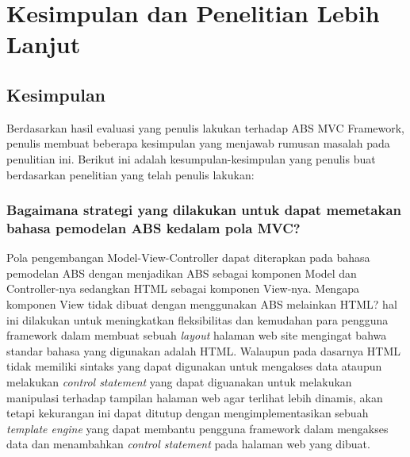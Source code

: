 \chapter{Kesimpulan dan Penelitian Lebih Lanjut}

\section{Kesimpulan}
Berdasarkan hasil evaluasi yang penulis lakukan terhadap ABS MVC Framework, penulis membuat beberapa kesimpulan yang menjawab rumusan masalah pada penulitian ini. Berikut ini adalah kesumpulan-kesimpulan yang penulis buat berdasarkan penelitian yang telah penulis lakukan:

\subsection{Bagaimana strategi yang dilakukan untuk dapat memetakan bahasa pemodelan ABS kedalam pola MVC?}

Pola pengembangan Model-View-Controller dapat diterapkan pada bahasa pemodelan ABS dengan menjadikan ABS sebagai komponen Model dan Controller-nya sedangkan HTML sebagai komponen View-nya. Mengapa komponen View tidak dibuat dengan menggunakan ABS melainkan HTML? hal ini dilakukan untuk meningkatkan fleksibilitas dan kemudahan para pengguna framework dalam membuat sebuah \textit{layout} halaman web site mengingat bahwa standar bahasa yang digunakan adalah HTML. Walaupun pada dasarnya HTML tidak memiliki sintaks yang dapat digunakan untuk mengakses data ataupun melakukan \textit{control statement} yang dapat diguanakan untuk melakukan manipulasi terhadap tampilan halaman web agar terlihat lebih dinamis, akan tetapi kekurangan ini dapat ditutup dengan mengimplementasikan sebuah \textit{template engine} yang dapat membantu pengguna framework dalam mengakses data dan menambahkan \textit{control statement} pada halaman web yang dibuat.\\

